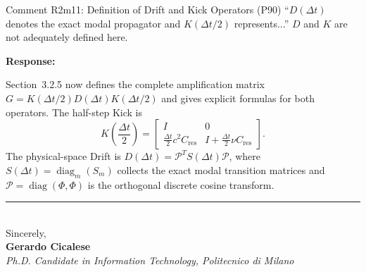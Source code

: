 \documentclass[11pt,a4paper]{article}
\newenvironment{response}{
    \par\vspace{1mm}\noindent\textbf{\textcolor{responseframe}{Response:}}\par\vspace{1mm}
}{
    \par\vspace{3mm}
}
\begin{document}
\begin{revcomment}{Comment R2m11: Definition of Drift and Kick Operators (P90)}
``$D(\Delta t)$ denotes the exact modal propagator and $K(\Delta t/2)$ represents...'' $D$ and $K$ are not adequately defined here.
\end{revcomment}

\begin{response}
Section~3.2.5 now defines the complete amplification matrix $G=K(\Delta t/2)D(\Delta t)K(\Delta t/2)$ and gives explicit formulas for both operators. The half-step Kick is
\[
K\!\left(\frac{\Delta t}{2}\right)=
\begin{bmatrix}
I & 0\\
\frac{\Delta t}{2}c^2C_{\mathrm{res}} & I+\frac{\Delta t}{2}\nu C_{\mathrm{res}}
\end{bmatrix}.
\]
The physical-space Drift is $D(\Delta t)=\mathcal P^T S(\Delta t)\mathcal P$, where $S(\Delta t)=\operatorname{diag}_m(S_m)$ collects the exact modal transition matrices and $\mathcal P=\operatorname{diag}(\Phi,\Phi)$ is the orthogonal discrete cosine transform.
\end{response}

\vspace{0.8cm}
\noindent\rule{\textwidth}{0.4pt}\\[0.5em]
\vspace{0.5cm}
\noindent Sincerely,\\[0.3em]
\textbf{Gerardo Cicalese}\\
\emph{Ph.D. Candidate in Information Technology, Politecnico di Milano}

\newpage


\end{document}
